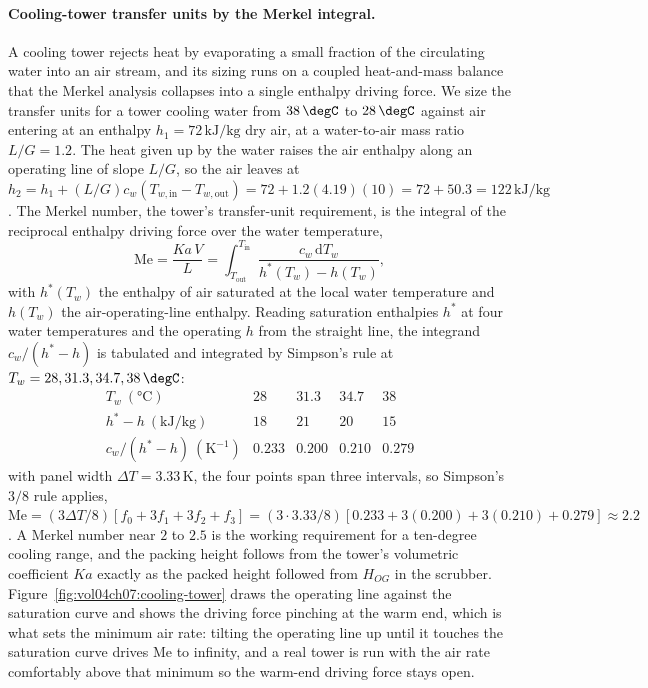 \paragraph{Cooling-tower transfer units by the Merkel integral.} A cooling
tower rejects heat by evaporating a small fraction of the circulating water into
an air stream, and its sizing runs on a coupled heat-and-mass balance that the
Merkel analysis collapses into a single enthalpy driving force. We size the
transfer units for a tower cooling water from $38\,\degC$ to $28\,\degC$
against air entering at an enthalpy $h_1 = 72\,\text{kJ/kg}$ dry air, at a
water-to-air mass ratio $L/G = 1.2$. The heat given up by the water raises the
air enthalpy along an operating line of slope $L/G$, so the air leaves at
$h_2 = h_1 + (L/G)c_w(T_{w,\text{in}}-T_{w,\text{out}}) = 72 + 1.2(4.19)(10) =
72 + 50.3 = 122\,\text{kJ/kg}$. The Merkel number, the tower's transfer-unit
requirement, is the integral of the reciprocal enthalpy driving force over the
water temperature,
\[
\text{Me} = \frac{K a\,V}{L} = \int_{T_{\text{out}}}^{T_{\text{in}}}
\frac{c_w\,\mathrm{d}T_w}{h^{*}(T_w) - h(T_w)},
\]
with $h^{*}(T_w)$ the enthalpy of air saturated at the local water temperature
and $h(T_w)$ the air-operating-line enthalpy. Reading saturation enthalpies
$h^{*}$ at four water temperatures and the operating $h$ from the straight line,
the integrand $c_w/(h^{*}-h)$ is tabulated and integrated by Simpson's rule at
$T_w = 28, 31.3, 34.7, 38\,\degC$:
\[
\begin{array}{lcccc}
T_w\ (\si{\degreeCelsius}) & 28 & 31.3 & 34.7 & 38\\
h^{*}-h\ (\text{kJ/kg}) & 18 & 21 & 20 & 15\\
c_w/(h^{*}-h)\ (\text{K}^{-1}) & 0.233 & 0.200 & 0.210 & 0.279
\end{array}
\]
with panel width $\Delta T = 3.33\,\text{K}$, the four points span three
intervals, so Simpson's $3/8$ rule applies,
$\text{Me} = (3\Delta T/8)[f_0 + 3f_1 + 3f_2 + f_3] =
(3\cdot 3.33/8)[0.233 + 3(0.200) + 3(0.210) + 0.279] \approx 2.2$. A Merkel
number near $2$ to $2.5$ is
the working requirement for a ten-degree cooling range, and the packing height
follows from the tower's volumetric coefficient $Ka$ exactly as the packed
height followed from $H_{OG}$ in the scrubber. Figure~\ref{fig:vol04ch07:cooling-tower}
draws the operating line against the saturation curve and shows the driving
force pinching at the warm end, which is what sets the minimum air rate: tilting
the operating line up until it touches the saturation curve drives $\text{Me}$
to infinity, and a real tower is run with the air rate comfortably above that
minimum so the warm-end driving force stays open.

